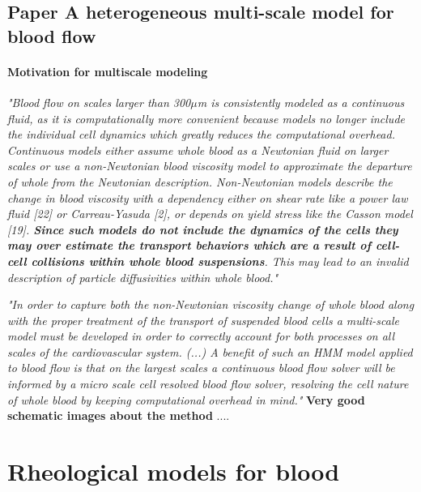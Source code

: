 \documentclass[11pt,letterpaper]{article}
\begin{document}
\subsection{Paper A heterogeneous multi-scale model for blood flow}
\paragraph{Motivation for multiscale modeling}

\textit{"Blood flow on scales larger than 300$\mu$m is consistently modeled as a continuous fluid, as it is computationally more convenient because models no longer include the individual cell dynamics which greatly reduces the computational overhead.  {\color{blue}Continuous models either assume whole blood as a Newtonian fluid on larger scales or use a non-Newtonian blood viscosity model to approximate the departure of whole from the Newtonian description.  Non-Newtonian models describe the change in blood viscosity with a dependency either on shear rate like a power law fluid [22] or Carreau-Yasuda [2], or depends on yield stress like the Casson model [19]. \textbf{Since such models do not include the dynamics of the cells they may over estimate the transport behaviors which are a result of cell-cell collisions within whole blood suspensions}}. This may lead to an invalid description of particle diffusivities within whole blood."}

\textit{"In order to capture both the non-Newtonian viscosity change of whole blood along with the proper treatment of the transport of suspended blood cells a multi-scale model must be developed in order to correctly account for both processes on all scales of the cardiovascular system. (...) 
A benefit of such an HMM model applied to blood flow is that on the largest scales a continuous blood flow solver will be informed by a micro scale cell resolved blood flow solver, resolving the cell nature of whole blood by keeping computational overhead in mind."}
\newline\newline
\textbf{Very good schematic images about the method}
....










\newpage
\section{Rheological models for blood}
\end{document}
